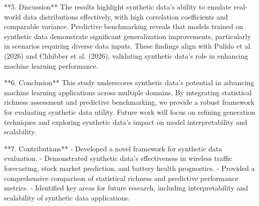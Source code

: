 **5. Discussion**  
The results highlight synthetic data's ability to emulate real-world data distributions effectively, with high correlation coefficients and comparable variance. Predictive benchmarking reveals that models trained on synthetic data demonstrate significant generalization improvements, particularly in scenarios requiring diverse data inputs. These findings align with Pulido et al. (2026) and Chhibber et al. (2026), validating synthetic data's role in enhancing machine learning performance.  

**6. Conclusion**  
This study underscores synthetic data's potential in advancing machine learning applications across multiple domains. By integrating statistical richness assessment and predictive benchmarking, we provide a robust framework for evaluating synthetic data utility. Future work will focus on refining generation techniques and exploring synthetic data's impact on model interpretability and scalability.  

**7. Contributions**  
- Developed a novel framework for synthetic data evaluation.  
- Demonstrated synthetic data's effectiveness in wireless traffic forecasting, stock market prediction, and battery health prognostics.  
- Provided a comprehensive comparison of statistical richness and predictive performance metrics.  
- Identified key areas for future research, including interpretability and scalability of synthetic data applications.